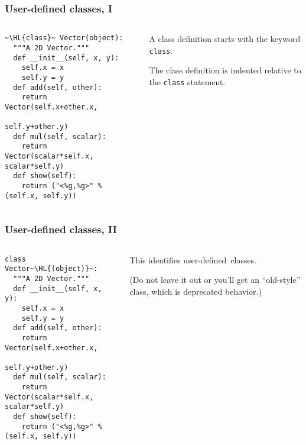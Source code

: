 \documentclass[english,serif,mathserif,xcolor=pdftex,dvipsnames,table]{beamer}
\begin{document}
\begin{frame}[fragile]
  \frametitle{User-defined classes, I}
  \begin{columns}[t]
    \begin{column}{0.5\textwidth}
\begin{lstlisting}
~\HL{class}~ Vector(object):
  """A 2D Vector."""
  def __init__(self, x, y):
    self.x = x
    self.y = y
  def add(self, other):
    return Vector(self.x+other.x,
                  self.y+other.y)
  def mul(self, scalar):
    return Vector(scalar*self.x, scalar*self.y)
  def show(self):
    return ("<%g,%g>" % (self.x, self.y))
\end{lstlisting}
    \end{column}
    \begin{column}{0.5\textwidth}
      \raggedleft
      A class definition starts with the keyword \texttt{class}.

      The class definition is indented relative to the \texttt{class}
      statement.
    \end{column}
  \end{columns}
\end{frame}


\begin{frame}[fragile]
  \frametitle{User-defined classes, II}
  \begin{columns}[t]
    \begin{column}{0.5\textwidth}
\begin{lstlisting}
class Vector~\HL{(object)}~:
  """A 2D Vector."""
  def __init__(self, x, y):
    self.x = x
    self.y = y
  def add(self, other):
    return Vector(self.x+other.x,
                  self.y+other.y)
  def mul(self, scalar):
    return Vector(scalar*self.x, scalar*self.y)
  def show(self):
    return ("<%g,%g>" % (self.x, self.y))
\end{lstlisting}
    \end{column}
    \begin{column}{0.5\textwidth}
      \raggedleft
      This identifies user-defined~classes.

      \+
      (Do not leave it out or you'll get an ``old-style'' class, which
      is deprecated behavior.)
    \end{column}
  \end{columns}
\end{frame}
\end{document}
